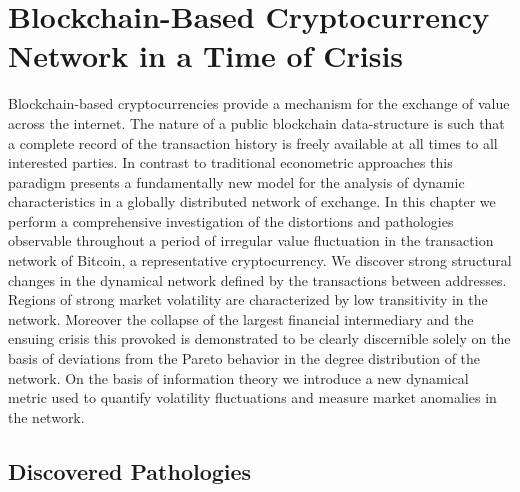 \chapter{Blockchain-Based Cryptocurrency Network in a Time of Crisis\label{cha:chapter5}}

Blockchain-based cryptocurrencies provide a mechanism for the exchange of value across the internet.
The nature of a public blockchain data-structure is such that a complete record of the transaction history is freely available at all times to all interested parties.
In contrast to traditional econometric approaches this paradigm presents a fundamentally new model for the analysis of dynamic characteristics in a globally distributed network of exchange. 
In this chapter we perform a comprehensive investigation of the distortions and pathologies observable throughout a period of irregular value fluctuation in the transaction network of Bitcoin, a representative cryptocurrency. 
We discover strong structural changes in the dynamical network defined by the transactions between addresses.  
Regions of strong market volatility are characterized by low transitivity in the network. 
Moreover the collapse of the largest financial intermediary and the ensuing crisis this provoked is demonstrated to be clearly discernible solely on the basis of deviations from the Pareto behavior in the degree distribution of the network. 
On the basis of information theory we introduce a new dynamical metric used to quantify volatility fluctuations and measure market anomalies in the network.

\section{Discovered Pathologies}

